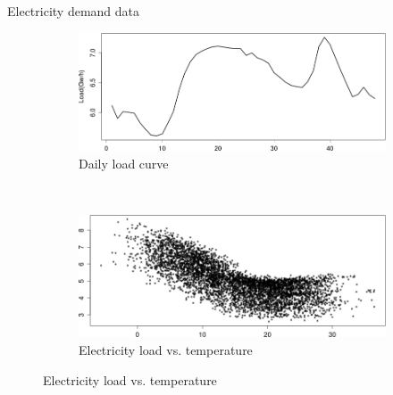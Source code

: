 \documentclass[xcolor=dvipsnames, smaller]{beamer}
\begin{document}
\begin{frame}{Electricity demand data}
\begin{figure}[!ht]
  \begin{subfigure}[t]{0.45\textwidth}
     \includegraphics[width=\textwidth]{pics/dailyloads.png}
     \caption{Daily load curve} %
  \end{subfigure}
  ~ %
  \begin{subfigure}[t]{0.45\textwidth}
     \includegraphics[width=\textwidth]{pics/consotemp.png}
     \caption{Electricity load vs. temperature}
  \end{subfigure}
\end{figure}
\end{frame}

\end{document}
